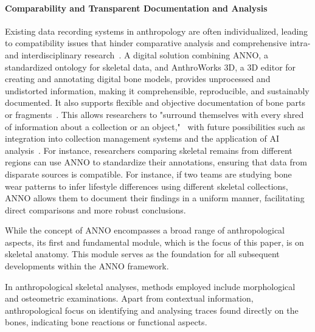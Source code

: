 \documentclass[sw]{iosart2x}
\begin{document}
\paragraph{Comparability and Transparent Documentation and Analysis}\label{sec:comp+transp} 
Existing data recording systems in anthropology are often individualized, leading to compatibility issues that hinder comparative analysis and comprehensive intra- and interdisciplinary research~\cite{HeuschkelSchmiedelLabudde2024}.
A digital solution combining ANNO, a standardized ontology for skeletal data, and AnthroWorks 3D, a 3D editor for creating and annotating digital bone models, provides unprocessed and undistorted information, making it comprehensible, reproducible, and sustainably documented.
It also supports flexible and objective documentation of bone parts or fragments~\cite{aw3dcidoc}.
This allows researchers to "surround themselves with every shred of information about a collection or an object,"~\cite[p.~148]{Palkovich.2001} with future possibilities such as integration into collection management systems and the application of AI analysis~\cite{HeuschkelSchmiedelLabudde2024}. 
For instance, researchers comparing skeletal remains from different regions can use ANNO to standardize their annotations, ensuring that data from disparate sources is compatible.
For instance, if two teams are studying bone wear patterns to infer lifestyle differences using different skeletal collections, ANNO allows them to document their findings in a uniform manner, facilitating direct comparisons and more robust conclusions.

While the concept of ANNO encompasses a broad range of anthropological aspects, its first and fundamental module, which is the focus of this paper, is on skeletal anatomy.
This module serves as the foundation for all subsequent developments within the ANNO framework.

In anthropological skeletal analyses, methods employed include morphological and osteometric examinations.
Apart from contextual information, anthropological focus on identifying and analysing traces found directly on the bones, indicating bone reactions or functional aspects.
\end{document}
